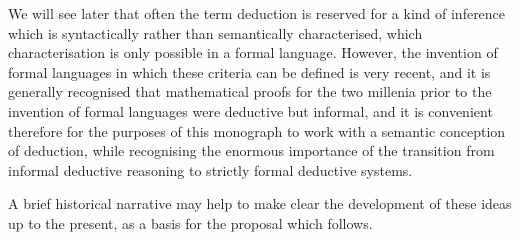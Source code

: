 \documentclass[10pt,titlepage]{book}
\begin{document}
We will see later that often the term deduction is reserved for a kind of inference which is syntactically rather than semantically characterised, which characterisation is only possible in a formal language.
However, the invention of formal languages in which these criteria can be defined is very recent, and it is generally recognised that mathematical proofs for the two millenia prior to the invention of formal languages were deductive but informal, and it is convenient therefore for the purposes of this monograph to work with a semantic conception of deduction, while recognising the enormous importance of the transition from informal deductive reasoning to strictly formal deductive systems.

A brief historical narrative may help to make clear the development of these ideas up to the present, as a basis for the proposal which follows.
\end{document}
